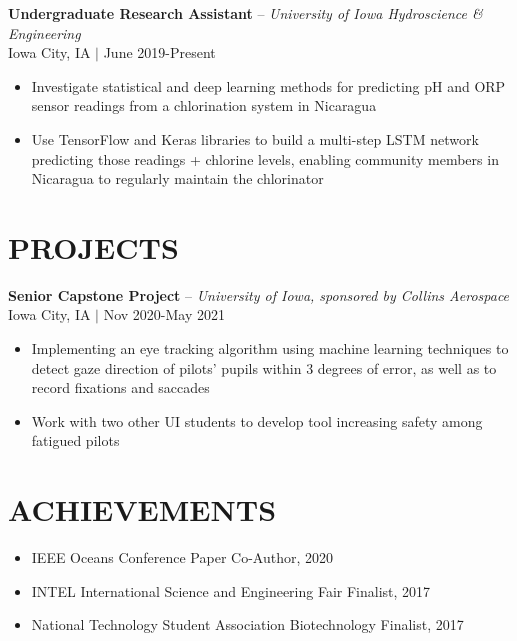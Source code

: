 \documentclass[line,margin]{res}
\begin{document}
\begin{resume}
    {\bf Undergraduate Research Assistant} -- {\sl University of Iowa Hydroscience \& Engineering} \\
    {\small Iowa City, IA $|$ June 2019-Present}

    \begin{itemize} \itemsep -2pt
       \item Investigate statistical and deep learning methods for predicting pH and ORP sensor readings from a chlorination system in Nicaragua
        \item Use TensorFlow and Keras libraries to build a multi-step LSTM network predicting those readings + chlorine levels, enabling community members in Nicaragua to regularly maintain the chlorinator
    \end{itemize}
    

\section{PROJECTS}
    {\bf Senior Capstone Project} -- {\sl University of Iowa, sponsored by Collins Aerospace} \\
    {\small Iowa City, IA $|$ Nov 2020-May 2021} 
    
     \begin{itemize} \itemsep -2pt
       \item Implementing an eye tracking algorithm using machine learning techniques to detect gaze direction of pilots’ pupils within 3 degrees of error, as well as to record fixations and saccades
        \item Work with two other UI students to develop tool increasing safety among fatigued pilots
    \end{itemize}

    
\section{ACHIEVEMENTS}
    \begin{itemize}[leftmargin=*] \itemsep -2pt
        \item IEEE Oceans Conference Paper Co-Author, \small{2020}
        \item INTEL International Science and Engineering Fair Finalist, \small{2017}
        \item  National Technology Student Association Biotechnology Finalist, \small{2017}

    \end{itemize}


\end{resume}
\end{document}
